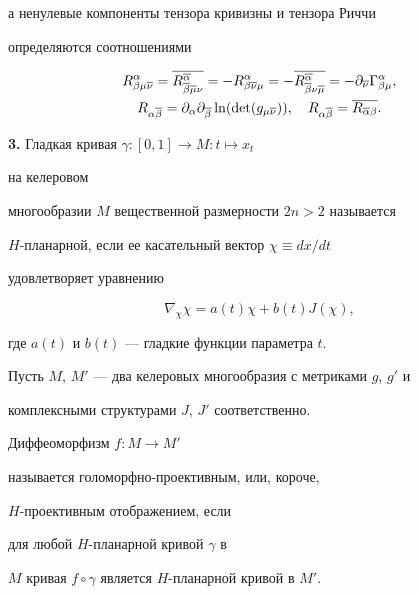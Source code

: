 а ненулевые компоненты тензора кривизны и тензора Риччи


определяются соотношениями


\begin{gather}


\label{riem}


R^{\alpha}_{\beta\mu\ol\nu} =


\ol{ R^{\ol\alpha}_{\ol\beta\ol\mu\nu} } =


-R^{\alpha}_{\beta\ol\nu\mu} =


-\ol{R^{\ol\alpha}_{\ol\beta\nu\ol\mu} } = -\partial_{\ol\nu}


\Gamma^{\alpha}_{\beta\mu},\\


\label{ric}


R_{\alpha\ol\beta} = \partial_{\alpha}\partial_{\ol\beta} \ln


(\det (g_{\mu\ol\nu})),


\quad R_{\alpha\ol\beta} = \ol{R_{\ol\alpha\beta}}.


\end{gather}





{\bf 3.} Гладкая кривая $\gamma : [0,1] \to M :t \mapsto x_t$


на келеровом


многообразии $M$ вещественной размерности $2n >2$ называется


$H$-планарной, если ее касательный вектор $\chi \equiv dx/dt$


удовлетворяет уравнению


$$


\nabla_{\chi} \chi = a(t)\chi + b(t) J(\chi),


$$


где $a(t)$ и $b(t)$ --- гладкие функции параметра $t$.





Пусть $M$, $M'$ --- два келеровых многообразия с метриками $g$, $g'$ и


комплексными структурами $J$, $J'$ соответственно.


Диффеоморфизм $f: M \to M'$


называется голоморфно-проективным, или, короче,


$H$-проективным отображением, если


для любой $H$-планарной кривой $\gamma$ в


$M$ кривая $f\circ \gamma$ является $H$-планарной кривой в $M'$.\;


